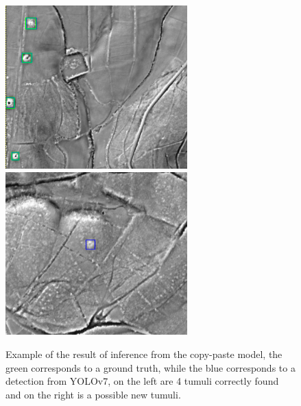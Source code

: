 \begin{figure}[H]
    \centering
    {{\includegraphics[width=7cm]{images/examples_inference/yolov7/mamoas/correct.png} }}
    \qquad
  {{\includegraphics[width=7cm]{images/examples_inference/yolov7/mamoas/possibleFound.png} }}
    \caption{Example of the result of inference from the copy-paste model, the green corresponds to a ground truth, while the blue corresponds to a detection from YOLOv7, on the left are 4 tumuli correctly found and on the right is a possible new tumuli.}
    \label{fig:yolo4mamoas}
\end{figure}

